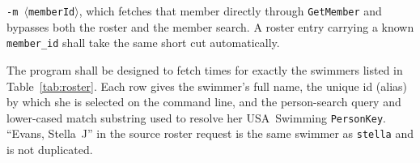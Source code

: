 \documentclass[12pt]{article}
\newcommand{\code}[1]{\texttt{#1}}
\newcommand{\req}[1]{\textbf{[#1]}}
\begin{document}
\begin{description}[style=nextline]
        \code{-m $\langle$memberId$\rangle$}, which fetches that member
        directly through \code{GetMember} and bypasses both the roster
        and the member search.  A roster entry carrying a known
        \code{member\_id} shall take the same short cut automatically.
  \item[\req{REQ-F-17}] The program shall be designed to fetch times
        for exactly the swimmers listed in Table~\ref{tab:roster}.
        Each row gives the swimmer's full name, the unique id (alias)
        by which she is selected on the command line, and the
        person-search query and lower-cased match substring used to
        resolve her USA~Swimming \code{PersonKey}.  ``Evans, Stella~J''
        in the source roster request is the same swimmer as
        \code{stella} and is not duplicated.
\end{description}
\end{document}
